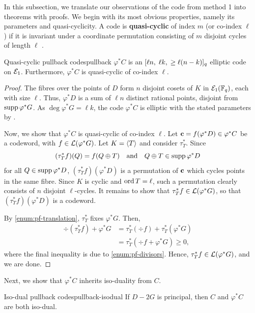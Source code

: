 \documentclass[twocolumn, 11pt]{scrartcl}
\begin{document}
In this subsection, we translate our observations of the code from method 1 into theorems with proofs. We begin with its most obvious properties, namely its parameters and quasi-cyclicity. A code is \textbf{quasi-cyclic} of index $m$ (or co-index $\ell$) if it is invariant under a coordinate permutation consisting of $m$ disjoint cycles of length $\ell$ \cite{ling2001algebraic}.

\begin{theorem}{Quasi-cyclic pullback codes}{pullback}
$\varphi^*C$ is an $[\ell n,\;\ell k,\;\geq\ell(n-k)]_q$ elliptic code on $\mathcal{E}_1$. Furthermore, $\varphi^*C$ is quasi-cyclic of co-index $\ell$.
\end{theorem}

\begin{proof}
The fibres over the points of $D$ form $n$ disjoint cosets of $K$ in $\mathcal{E}_1(\mathbb{F}_q)$, each with size $\ell$. Thus, $\varphi^*D$ is a sum of $\ell n$ distinct rational points, disjoint from $\operatorname{supp}\varphi^*G$. As $\deg\varphi^*G=\ell k$, the code $\varphi^*C$ is elliptic with the stated parameters by .

Now, we show that $\varphi^*C$ is quasi-cyclic of co-index $\ell$. Let $\mathbf{c}=f(\varphi^*D)\in\varphi^*C$ be a codeword, with $f\in\mathcal{L}(\varphi^*G)$. Let $K=\langle T\rangle$ and consider $\tau_T^*$. Since
\[ (\tau_T^*f)(Q)=f(Q\oplus T) \quad\text{and}\quad Q\oplus T\in\operatorname{supp}\varphi^*D \]
for all $Q\in\operatorname{supp}\varphi^*D$, $(\tau_T^*f)(\varphi^*D)$ is a permutation of $\mathbf{c}$ which cycles points in the same fibre. Since $K$ is cyclic and $\operatorname{ord} T=\ell$, such a permutation clearly consists of $n$ disjoint $\ell$-cycles. It remains to show that $\tau_T^*f\in\mathcal{L}(\varphi^*G)$, so that $(\tau_T^*f)(\varphi^*D)$ is a codeword.

By \ref{enum:pf-translation}, $\tau_T^*$ fixes $\varphi^*G$. Then,
\begin{align*}
    \div(\tau_T^* f)+\varphi^*G&=\tau_T^*(\div f)+\tau_T^*(\varphi^*G) \\
    &=\tau_T^*(\div f+\varphi^*G)\geq0,
\end{align*}
where the final inequality is due to \ref{enum:pf-divisors}. Hence, $\tau_T^* f\in\mathcal{L}(\varphi^*G)$, and we are done.
\end{proof}

Next, we show that $\varphi^*C$ inherits iso-duality from $C$.

\begin{corollary}{Iso-dual pullback codes}{pullback-isodual}
    If $D-2G$ is principal, then $C$ and $\varphi^*C$ are both iso-dual.
\end{corollary}
\end{document}
